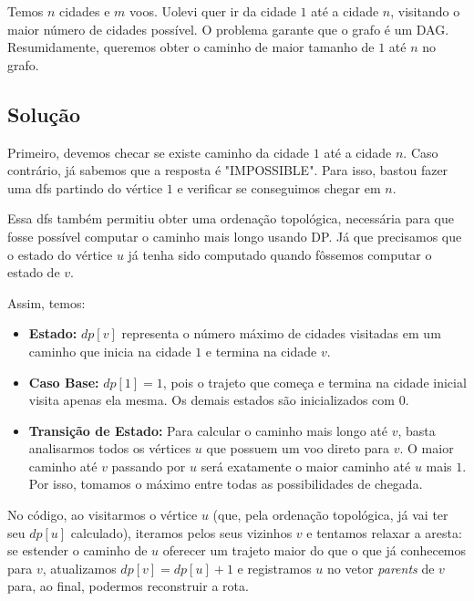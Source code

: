 \documentclass[12pt,a4paper]{article}
\begin{document}
Temos $n$ cidades e $m$ voos. Uolevi quer ir da cidade $1$ até a cidade $n$, visitando o maior número de cidades possível. 
O problema garante que o grafo é um DAG. Resumidamente, queremos obter o caminho de maior tamanho de $1$ até $n$ no grafo.

\subsection*{Solução}

Primeiro, devemos checar se existe caminho da cidade $1$ até a cidade $n$. Caso contrário, já sabemos que a resposta é "IMPOSSIBLE".
Para isso, bastou fazer uma dfs partindo do vértice $1$ e verificar se conseguimos chegar em $n$.

Essa dfs também permitiu obter uma ordenação topológica, necessária para que
fosse possível computar o caminho mais longo usando DP. Já que precisamos
que o estado do vértice $u$ já tenha sido computado quando fôssemos computar o estado de $v$.

Assim, temos:

\begin{itemize}
    \item \textbf{Estado:} $dp[v]$ representa o número máximo de cidades visitadas em um caminho que inicia na cidade $1$ e termina na cidade $v$. 
    \item \textbf{Caso Base:} $dp[1] = 1$, pois o trajeto que começa e termina na cidade inicial visita apenas ela mesma. Os demais estados são inicializados com $0$. 
    \item \textbf{Transição de Estado:} Para calcular o caminho mais longo até $v$, basta analisarmos todos os vértices $u$ que possuem um voo direto para $v$. O maior caminho até $v$ passando por $u$
    será exatamente o maior caminho até $u$ mais $1$. Por isso, tomamos o máximo entre todas as possibilidades de chegada. 
\end{itemize}

No código, ao visitarmos o vértice $u$ (que, pela ordenação topológica,
já vai ter seu $dp[u]$ calculado), iteramos pelos seus vizinhos
$v$ e tentamos relaxar a aresta: se estender o caminho de $u$ oferecer um
trajeto maior do que o que já conhecemos para $v$, atualizamos
$dp[v] = dp[u] + 1$ e registramos $u$ no vetor \textit{parents}
de $v$ para, ao final, podermos reconstruir a rota.
\end{document}
